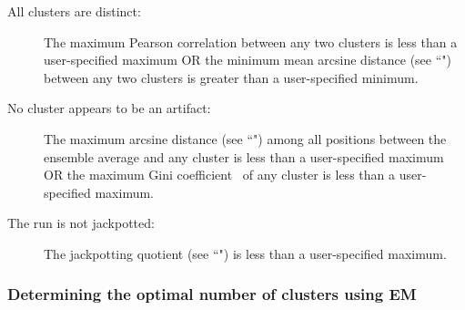 \documentclass{article}
\begin{document}
\begin{enumerate}
\begin{description}
        \item[All clusters are distinct:] The maximum Pearson correlation between any two clusters is less than a user-specified maximum OR the minimum mean arcsine distance (see ``") between any two clusters is greater than a user-specified minimum.
        \item[No cluster appears to be an artifact:] The maximum arcsine distance (see ``") among all positions between the ensemble average and any cluster is less than a user-specified maximum OR the maximum Gini coefficient~\cite{Rouskin2014} of any cluster is less than a user-specified maximum.
        \item[The run is not jackpotted:] The jackpotting quotient (see ``") is less than a user-specified maximum.
    \end{description}
\end{enumerate}

\subsubsection{Determining the optimal number of clusters using EM}
\label{em-optimal-k}
\end{document}

